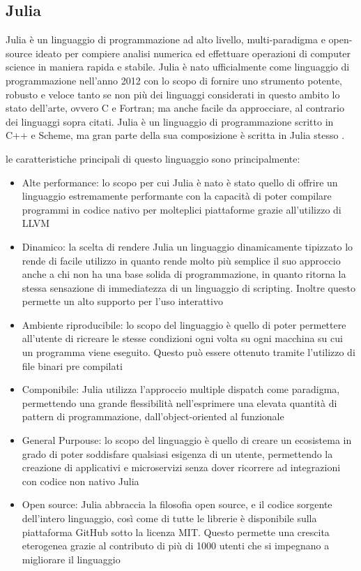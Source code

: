 \subsection{Julia}
Julia è un linguaggio di programmazione ad alto livello, 
multi-paradigma e open-source ideato per compiere analisi 
numerica ed effettuare operazioni di computer science in 
maniera rapida e stabile. Julia è nato ufficialmente come 
linguaggio di programmazione nell’anno 2012 con lo scopo di 
fornire uno strumento potente, robusto e veloce tanto se non 
più dei linguaggi considerati in questo ambito lo stato 
dell’arte, ovvero C e Fortran;  ma anche facile da approcciare, 
al contrario dei linguaggi sopra citati. Julia è un linguaggio 
di programmazione scritto in C++ e Scheme, ma gran parte della 
sua composizione è scritta in Julia stesso 
\cite{wiki:Julia_(programming_language)}.

le caratteristiche principali di questo linguaggio sono 
principalmente:
\begin{itemize}
    \item Alte performance: lo scopo per cui Julia è nato è 
    stato quello di offrire un linguaggio estremamente 
    performante con la capacità di poter compilare programmi 
    in codice nativo per molteplici piattaforme grazie 
    all’utilizzo di LLVM

    \item Dinamico: la scelta di rendere Julia un linguaggio 
    dinamicamente tipizzato lo rende di facile utilizzo in 
    quanto rende molto più semplice il suo approccio anche a 
    chi non ha una base solida di programmazione, in quanto 
    ritorna la stessa sensazione di immediatezza di un 
    linguaggio di scripting. Inoltre questo permette un alto 
    supporto per l’uso interattivo

    \item Ambiente riproducibile: lo scopo del linguaggio è 
    quello di poter permettere all’utente di ricreare le 
    stesse condizioni ogni volta su ogni macchina su cui un 
    programma viene eseguito. Questo può essere ottenuto 
    tramite l’utilizzo di file binari pre compilati
    \item Componibile: Julia utilizza l’approccio multiple 
    dispatch come paradigma, permettendo una grande 
    flessibilità nell’esprimere una elevata quantità di 
    pattern di programmazione, dall’object-oriented al 
    funzionale
    \item General Purpouse: lo scopo del linguaggio è quello 
    di creare un ecosistema in grado di poter soddisfare 
    qualsiasi esigenza di un utente, permettendo la creazione 
    di applicativi e microservizi senza dover ricorrere ad 
    integrazioni con codice non nativo Julia
    \item Open source: Julia abbraccia la filosofia open source, 
    e il codice sorgente dell’intero linguaggio, così come di 
    tutte le librerie è disponibile sulla piattaforma GitHub 
    sotto la licenza MIT. Questo permette una crescita 
    eterogenea grazie al contributo di più di 1000 utenti 
    che si impegnano a migliorare il linguaggio
\end{itemize}

